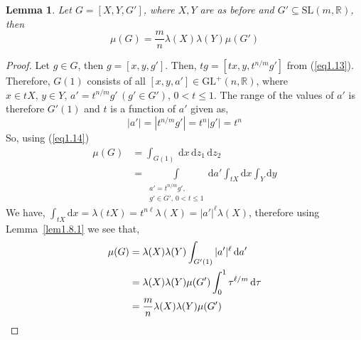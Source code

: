 \documentclass[11pt]{article}
\newtheorem{lemma}[theorem]{Lemma}
\theoremstyle{definition}
\begin{document}
\begin{lemma}\label{lem1.8.2}
    Let $G=[X,Y,G']$, where $X, Y$ are as before and $G' \subseteq \mathrm{SL}(m, \mathbb{R})$, then
    \[	
        \mu (G)= \frac{m}{n} \lambda (X) \lambda (Y) \mu (G')
    \]
\end{lemma}
\begin{proof}
    Let $g\in G$, then $g=[x,y,g']$.
    Then, $tg= [tx, y, t^{n/m}g']$ from (\ref{eq1.13}).
    Therefore, $G(1)$ consists of all $[x,y, a'] \in \mathrm{GL}^+(n, \mathbb{R})$, where $x \in tX,\, y\in Y,\, a'= t^{n/m}g' \,(g' \in G'),\, 0 < t \le 1$.
    The range of the values of $a'$ is therefore $G'(1)$ and $t$ is a function of $a'$ given as,
    \[	
        |a'|= |t^{n/m}g'|=t^n |g'|=t^n
    \]
    So, using (\ref{eq1.14})
    \begin{align*}
        \mu (G)&= \int_{G(1)} \, \mathrm{d} x \, \mathrm{d} z_1 \, \mathrm{d} z_2\\
        &=\int\limits_{\substack{a' = t^{n/m}g', \\ g' \in G', \, 0 < t \le 1}} \mathrm{d} a' \int_{tX} \mathrm{d} x \int_{Y} \mathrm{d} y
    \end{align*}
    We have, $\displaystyle\int_{tX} \mathrm{d} x = \lambda (tX) = t^{n \ell} \lambda (X)= |a'|^ \ell \lambda (X)$, therefore using Lemma~\ref{lem1.8.1} we see that,
    \begin{align*}
        \mu (G)&= \lambda (X) \lambda (Y) \int_{G'(1)} |a'|^ \ell \, \mathrm{d} a'\\
        &= \lambda (X) \lambda (Y) \mu (G') \int_{0}^1 \tau ^{\ell/m} \, \mathrm{d} \tau \hfill\\
        &= \frac{m}{n} \lambda (X) \lambda (Y) \mu (G')
    \end{align*}
\end{proof}
\end{document}
